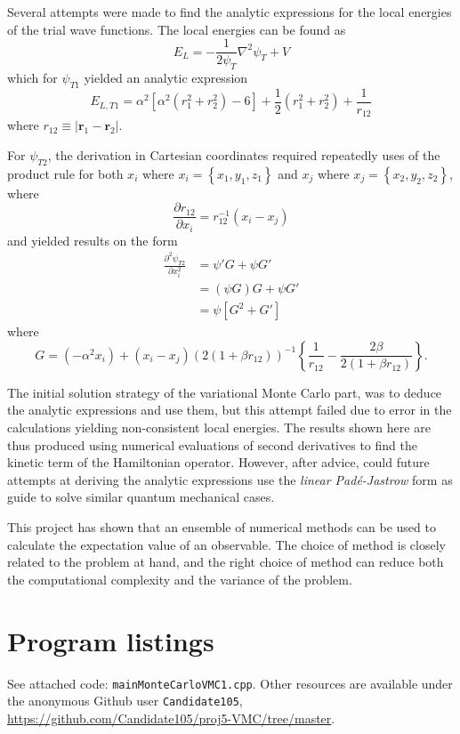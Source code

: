\documentclass[a4paper,11pt]{article}
\begin{document}
Several attempts were made to find the analytic expressions for the local energies of the trial wave functions. The local energies can be found as
\[ E_L = -\frac{1}{2 \psi_T} \nabla^2 \psi_T + V \]
which for $\psi_{T1}$ yielded an analytic expression
\[E_{L, T1} = \alpha^2 \left[ \alpha^2 \left( r_1^2 + r_2^2 \right) - 6 \right] + \frac{1}{2}\left( r_1^2 + r_2^2 \right) + \frac{1}{r_{12}} \]
where $r_{12} \equiv |\mathbf{r}_1 - \mathbf{r}_2|$.

For $\psi_{T2}$, the derivation in Cartesian coordinates required repeatedly uses of the product rule for both $x_i$ where $x_i = \left\{ x_1, y_1, z_1 \right\}$ and $x_j$ where $x_j = \left\{ x_2, y_2, z_2 \right\}$, where
\[ \frac{\partial r_{12}}{\partial x_i} = r_{12}^{-1} \left( x_i - x_j \right) \]
and yielded results on the form
\begin{align*}
    \frac{\partial^2 \psi_{T2}}{\partial x_i^2} &= \psi' G + \psi G' \\
    &= \left( \psi G \right)G + \psi G' \\
    &= \psi \left[ G^2 + G' \right]
\end{align*}
where 
\[ G = \left( -\alpha^2 x_i \right) + \left( x_i - x_j \right)\left( 2\left( 1+ \beta r_{12} \right) \right)^{-1} \left\{ \frac{1}{r_{12} }- \frac{2\beta}{2\left( 1+ \beta r_{12} \right)} \right\}. \]

The initial solution strategy of the variational Monte Carlo part, was to deduce the analytic expressions and use them, but this attempt failed due to error in the calculations yielding non-consistent local energies. The results shown here are thus produced using numerical evaluations of second derivatives to find the kinetic term of the Hamiltonian operator. However, after advice, could future attempts at deriving the analytic expressions use the \textit{linear Pad\'e-Jastrow} form as guide to solve similar quantum mechanical cases.

This project has shown that an ensemble of numerical methods can be used to calculate the expectation value of an observable. The choice of method is closely related to the problem at hand, and the right choice of method can reduce both the computational complexity and the variance of the problem.





\clearpage
\appendix
\section{Program listings}
See attached code: \texttt{mainMonteCarloVMC1.cpp}. Other resources are available under the anonymous Github user \texttt{Candidate105}, \url{https://github.com/Candidate105/proj5-VMC/tree/master}.

%
\end{document}
